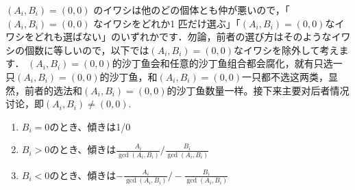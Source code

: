 \begin{Parallel}[v]{0.47\textwidth}{0.47\textwidth}

\ParallelLText
{
\( (A_i, B_i) = (0, 0) \) のイワシは他のどの個体とも仲が悪いので，「\( (A_i, B_i) = (0, 0) \) なイワシをどれか1 匹だけ選ぶ」「\( (A_i, B_i) = (0, 0) \)なイワシをどれも選ばない」のいずれかです．勿論，前者の選び方はそのようなイワシの個数に等しいので，以下では\( (A_i, B_i) = (0, 0) \)なイワシを除外して考えます．
}
\ParallelRText
{
    \( (A_i,B_i)=(0,0) \)的沙丁鱼会和任意的沙丁鱼组合都会腐化，就有只选一只\( (A_i,B_i)=(0,0) \)的沙丁鱼，和\( (A_i,B_i)=(0,0) \)一只都不选这两类，显然，前者的选法和\( (A_i,B_i)=(0,0) \)的沙丁鱼数量一样。接下来主要对后者情况讨论，即\( (A_i,B_i) \neq (0,0) \).
}
\ParallelPar

\ParallelPar

\end{Parallel}
\begin{enumerate}
    \item \( B_i=0 \)のとき、傾きは1/0

\textcolor{red}{
}

    \item \(B_i >0 \)のとき、傾きは\( \frac{A_i}{\gcd(A_i,B_i)} / \frac{B_i}{\gcd(A_i,B_i)} \)

\textcolor{red}{
}

    \item \(B_i <0 \)のとき、傾きは\( -\frac{A_i}{\gcd(A_i,B_i)} / -\frac{B_i}{\gcd(A_i,B_i)} \)

\textcolor{red}{
}

\end{enumerate}

\begin{Parallel}[v]{0.47\textwidth}{0.47\textwidth}
\end{Parallel}

